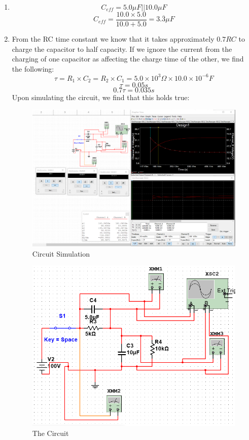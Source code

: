 \documentclass{article}
\begin{document}
\begin{enumerate}
\begin{enumerate}[label=(\alph*)]
		\item
		\[ C_{eff} = 5.0 \mu F || 10.0 \mu F \]
		\[ C_{eff} = \frac{10.0 \times 5.0}{10.0 + 5.0} = 3.\overline{3} \mu F \]
		
		\item From the RC time constant we know that it takes approximately $0.7 RC$ to charge the capacitor to half capacity.
		If we ignore the current from the charging of one capacitor as affecting the charge time of the other, we find the following:
		\[ \tau = R_1 \times C_2 = R_2 \times C_1 = 5.0 \times 10^3 \Omega \times 10.0 \times 10^{-6} F \]
		\[ \tau =  0.05 s \]
		\[ 0.7 \tau = 0.035 s \]
		Upon simulating the circuit, we find that this holds true:
		\begin{figure}[H]
			\caption{Circuit Simulation}
			\includegraphics[width=\textwidth]{Simulation1}
		\end{figure}
		\begin{figure}[H]
			\caption{The Circuit}
			\includegraphics[width=\textwidth]{circuit}

\end{figure}
\end{enumerate}
\end{enumerate}
\end{document}
